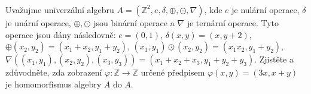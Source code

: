 \subsubsection{}
Uvažujme univerzální algebru 
$A=\left ( \mathbb{Z}^{2},e,\delta,\oplus ,\odot, \nabla \right )$, 
kde $e$ je nulární operace, $\delta$ je unární
operace, $\oplus, \odot$ jsou binární operace a $\nabla$ je ternární
operace. Tyto operace jsou dány následovně: $e=(0,1)$, $\delta(x,y)=(x,y+2)$,
$\oplus(x_{2},y_{2})=(x_{1} + x_{2}, y_{1}+y_{2})$, $(x_{1},y_{1}) \odot
(x_{2},y_{2})=(x_{1}x_{2},y_{1}+y_{2})$, $\nabla ((x_{1},y_{1}),
(x_{2},y_{2}), (x_{3},y_{3})) = (x_{1} + x_{2} + x_{3}, y_{1} + y_{2} + y_{3})$.
Zjistěte a zdůvodněte, zda zobrazení $\varphi : \mathbb{Z} \rightarrow
\mathbb{Z}$ určené předpisem $\varphi(x,y) = (3x, x+y)$ je homomorfismus algebry
$A$ do $A$.
